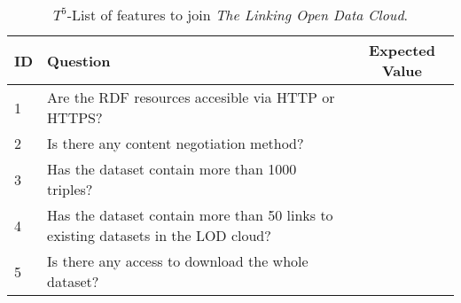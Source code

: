\begin{table}[t]
\scriptsize
\renewcommand{\arraystretch}{1.3}
\begin{center}
\begin{tabular}[c]{|l|p{5cm}|c|} 
\hline
  \textbf{ID} & \textbf{Question} &  \textbf{Expected Value}  \\\hline
   1& Are the RDF resources accesible via HTTP or HTTPS? & \si  \\ \hline
   2& Is there any content negotiation method? & \si  \\ \hline
   3& Has the dataset contain more than 1000 triples? & \si  \\ \hline
   4& Has the dataset contain more than 50 links to existing datasets in the LOD cloud? & \si \\ \hline
   5& Is there any access to download the whole dataset? & \si  \\ \hline
  \hline
  \end{tabular}
  \caption{$T^{5}$-List of features to join \textit{The Linking Open Data Cloud}.}
  \label{table:validation-t5}
  \end{center}
\end{table} 




